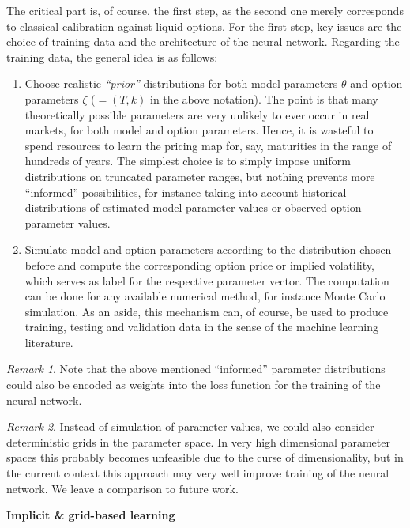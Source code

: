 \documentclass{article}
\theoremstyle{remark}
\newtheorem{remark}{Remark}
\begin{document}
The critical part is, of course, the first step, as the second one merely
corresponds to classical calibration against liquid options. For the first
step, key issues are the choice of training data and the architecture of the
neural network. Regarding the training data, the general idea is as follows:
\begin{enumerate}
\item Choose realistic \emph{``prior''} distributions for both model
  parameters $\theta$ and option parameters $\zeta$ ($= (T,k)$ in the above
  notation). The point is that many theoretically possible parameters are very
  unlikely to ever occur in real markets, for both model and option
  parameters. Hence, it is wasteful to spend resources to learn the pricing
  map for, say, maturities in the range of hundreds of years. The simplest
  choice is to simply impose uniform distributions on truncated parameter
  ranges, but nothing prevents more ``informed'' possibilities, for instance
  taking into account historical distributions of estimated model parameter
  values or observed option parameter values.
\item Simulate model and option parameters according to the distribution
  chosen before and compute the corresponding option price or implied
  volatility, which serves as label for the respective parameter vector. The
  computation can be done for any available numerical method, for instance
  Monte Carlo simulation. As an aside, this mechanism can, of course, be used
  to produce training, testing and validation data in the sense of the machine
  learning literature.
\end{enumerate}

\begin{remark}
  Note that the above mentioned ``informed'' parameter distributions could
  also be encoded as weights into the loss function for the training of the
  neural network.
\end{remark}

\begin{remark}
  Instead of simulation of parameter values, we could also consider
  deterministic grids in the parameter space. In very high dimensional
  parameter spaces this probably becomes unfeasible due to the curse of
  dimensionality, but in the current context this approach may very well
  improve training of the neural network. We leave a comparison to future
  work.
\end{remark}

\vspace*{0.5cm}
\textbf{Implicit \& grid-based learning}
\end{document}
